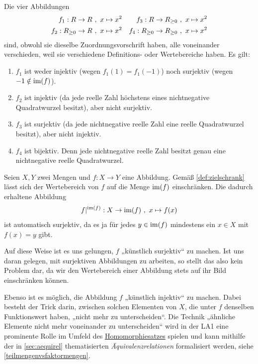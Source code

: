 \begin{bsp} \label{bsp:injsur}
    Die vier Abbildungen
    \begin{align*}
        f_1 : \relax R \to \relax R \ &,\ x\mapsto x^2 & f_3 :\relax R\to \relax R_{\ge 0} \ &,\ x\mapsto x^2 \\
        f_2 : \relax R_{\ge 0} \to \relax R \ &,\ x\mapsto x^2 & f_4 :\relax R_{\ge 0} \to \relax R_{\ge 0} \ &,\ x\mapsto x^2
    \end{align*}
    sind, obwohl sie dieselbe Zuordnungsvorschrift haben, alle voneinander verschieden, weil sie verschiedene Definitions- oder Wertebereiche haben. Es gilt:
    \begin{enumerate}
        \item $f_1$ ist weder injektiv (wegen $f_1(1)=f_1(-1)$) noch surjektiv (wegen $-1\notin \operatorname{im}(f)$).
        \item $f_2$ ist injektiv (da jede reelle Zahl höchstens eines nichtnegative Quadratwurzel besitzt), aber nicht surjektiv.
        \item $f_3$ ist surjektiv (da jede nichtnegative reelle Zahl eine reelle Quadratwurzel besitzt), aber nicht injektiv.
        \item $f_4$ ist bijektiv. Denn jede nichtnegative reelle Zahl besitzt genau eine nichtnegative reelle Quadratwurzel.
    \end{enumerate}
\end{bsp}


\begin{vorschau} \label{surjektivmachen}
    Seien $X,Y$ zwei Mengen und $f:X\to Y$ eine Abbildung. Gemäß \cref{def:zielschrank} lässt sich der Wertebereich von $f$ auf die Menge $\operatorname{im}(f)$ einschränken. Die dadurch erhaltene Abbildung
        \[ f\vert^{\operatorname{im}(f)} : X \to \operatorname{im}(f) \ ,\ x\mapsto f(x) \]
    ist automatisch surjektiv, da es ja für jedes $y\in \operatorname{im}(f)$ mindestens ein $x\in X$ mit $f(x)=y$ gibt.

    Auf diese Weise ist es uns gelungen, $f$ „künstlich surjektiv“ zu machen. Ist uns daran gelegen, mit surjektiven Abbildungen zu arbeiten, so stellt das also kein Problem dar, da wir den Wertebereich einer Abbildung stets auf ihr Bild einschränken können.

    Ebenso ist es möglich, die Abbildung $f$ „künstlich injektiv“ zu machen. Dabei besteht der Trick darin, zwischen solchen Elementen von $X$, die unter $f$ denselben Funktionswert haben, „nicht mehr zu unterscheiden“. Die Technik „ähnliche Elemente nicht mehr voneinander zu unterscheiden“ wird in der LA1 eine prominente Rolle im Umfeld des \href{https://de.wikipedia.org/wiki/Homomorphiesatz}{Homomorphiesatzes} spielen und kann mithilfe der in \cref{sec:aequirel} thematisierten \emph{Äquivalenzrelationen} formalisiert werden, siehe \cref{teilmengenvsfaktormengen}.
\end{vorschau}





